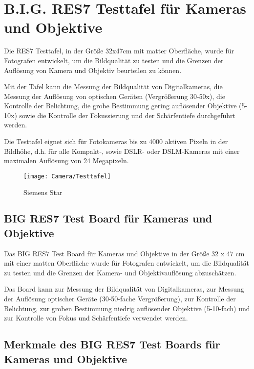 \bigskip

\section{B.I.G. RES7 Testtafel für Kameras und Objektive}

Die RES7 Testtafel, in der Größe 32x47cm mit matter Oberfläche, wurde für Fotografen entwickelt, um die Bildqualität zu testen und die Grenzen der Auflösung von Kamera und Objektiv beurteilen zu können.

Mit der Tafel kann die Messung der Bildqualität von Digitalkameras, die Messung der Auflösung von optischen Geräten (Vergrößerung 30-50x), die Kontrolle der Belichtung, die grobe Bestimmung gering auflösender Objektive (5-10x) sowie die Kontrolle der Fokussierung und der Schärfentiefe durchgeführt werden.

Die Testtafel eignet sich für Fotokameras bis zu 4000 aktiven Pixeln in der Bildhöhe, d.h. für alle Kompakt-, sowie DSLR- oder DSLM-Kameras mit einer maximalen Auflösung von 24 Megapixeln.

\begin{figure}
    \begin{center}
        \texttt{[image: Camera/Testtafel]}
        
        \caption{Siemens Star}
    \end{center}    
\end{figure}

\subsection{BIG RES7 Test Board für Kameras und Objektive}
Das BIG RES7 Test Board für Kameras und Objektive in der Größe 32 x 47 cm mit einer matten Oberfläche wurde für Fotografen entwickelt, um die Bildqualität zu testen und die Grenzen der Kamera- und Objektivauflösung abzuschätzen.

Das Board kann zur Messung der Bildqualität von Digitalkameras, zur Messung der Auflösung optischer Geräte (30-50-fache Vergrößerung), zur Kontrolle der Belichtung, zur groben Bestimmung niedrig auflösender Objektive (5-10-fach) und zur Kontrolle von Fokus und Schärfentiefe verwendet werden.

\subsection{Merkmale des BIG RES7 Test Boards für Kameras und Objektive}

